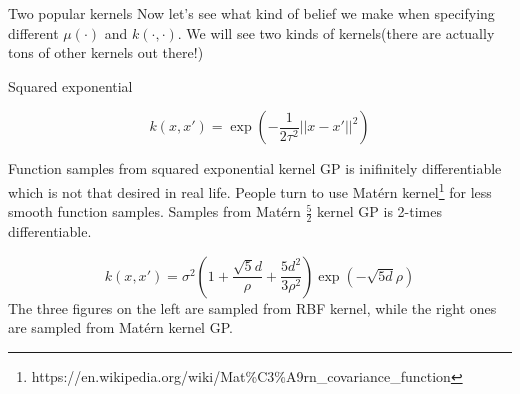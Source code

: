 \documentclass{beamer}
\begin{document}
\begin{frame}{Two popular kernels}
Now let's see what kind of belief we make when specifying different $\mu(\cdot)$ and $k(\cdot, \cdot)$.
We will see two kinds of kernels(there are actually tons of other kernels out there!)

Squared exponential

$$k(x, x') = \exp(-\frac{1}{2\tau^2} ||x - x'||^2)$$

Function samples from squared exponential kernel GP is inifinitely differentiable which is not that desired in real life. People turn to use Matérn kernel\footnote{https://en.wikipedia.org/wiki/Mat\%C3\%A9rn\_covariance\_function} for less smooth function samples. Samples from Matérn $\frac{5}{2}$ kernel GP is 2-times differentiable.

$$k(x, x') = \sigma^2 (1 + \frac{\sqrt{5} d}{\rho} + \frac{5d^2 }{3\rho^2}) \exp(-\sqrt{5d}{\rho})$$
The three figures on the left are sampled from RBF kernel, while the right ones are sampled from Matérn kernel GP. 
\end{frame}
\end{document}
